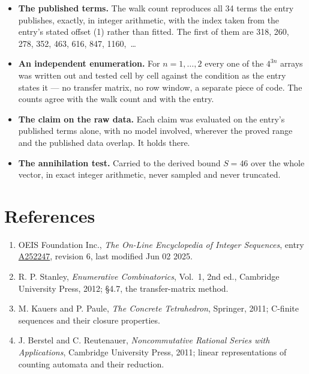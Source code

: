 \documentclass[11pt]{article}
\theoremstyle{definition}
\begin{document}
\begin{itemize}

\item {\bfseries The published terms.} The walk count reproduces all 34 terms the entry publishes, exactly, in integer arithmetic, with the index taken from the entry's stated offset (1) rather than fitted. The first of them are 318, 260, 278, 352, 463, 616, 847, 1160,~\dots

\item {\bfseries An independent enumeration.} For $n = 1,\dots,2$ every one of the $4^{3n}$ arrays was written out and tested cell by cell against the condition as the entry states it --- no transfer matrix, no row window, a separate piece of code. The counts agree with the walk count and with the entry.

\item {\bfseries The claim on the raw data.} Each claim was evaluated on the entry's published terms alone, with no model involved, wherever the proved range and the published data overlap. It holds there.

\item {\bfseries The annihilation test.} Carried to the derived bound $S = 46$ over the whole vector, in exact integer arithmetic, never sampled and never truncated.

\end{itemize}

\section{References}

\begin{enumerate}

\item OEIS Foundation Inc., \emph{The On-Line Encyclopedia of Integer Sequences}, entry \href{https://oeis.org/A252247}{A252247}, revision 6, last modified Jun 02 2025.

\item R. P. Stanley, \emph{Enumerative Combinatorics}, Vol.~1, 2nd ed., Cambridge University Press, 2012; \S4.7, the transfer-matrix method.

\item M. Kauers and P. Paule, \emph{The Concrete Tetrahedron}, Springer, 2011; C-finite sequences and their closure properties.

\item J. Berstel and C. Reutenauer, \emph{Noncommutative Rational Series with Applications}, Cambridge University Press, 2011; linear representations of counting automata and their reduction.

\end{enumerate}
\end{document}
